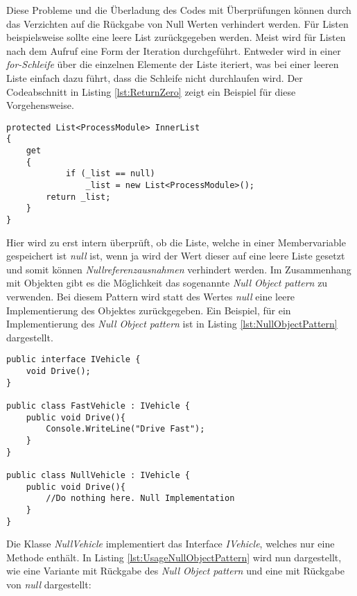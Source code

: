 \SuperPar Diese Probleme und die Überladung des Codes mit Überprüfungen können durch das Verzichten auf die Rückgabe von Null Werten verhindert werden. Für Listen beispielsweise sollte eine leere List zurückgegeben werden. Meist wird für Listen nach dem Aufruf eine Form der Iteration durchgeführt. Entweder wird in einer \textit{for-Schleife} über die einzelnen Elemente der Liste iteriert, was bei einer leeren Liste einfach dazu führt, dass die Schleife nicht durchlaufen wird. Der Codeabschnitt in Listing \ref{lst:ReturnZero} zeigt ein Beispiel für diese Vorgehensweise.

\begin{lstlisting}[language={[Sharp]C}, caption=Beispiele für Rückgabe einer leeren Liste statt eines Null Wertes, label=lst:ReturnZero]
protected List<ProcessModule> InnerList
{
	get
	{
			if (_list == null)
				_list = new List<ProcessModule>();
		return _list;
	}
}
\end{lstlisting}

\SuperPar Hier wird zu erst intern überprüft, ob die Liste, welche in einer Membervariable gespeichert ist \textit{null} ist, wenn ja wird der Wert dieser auf eine leere Liste gesetzt und somit können \textit{Nullreferenzausnahmen} verhindert werden. Im Zusammenhang mit Objekten gibt es die Möglichkeit das sogenannte \textit{Null Object pattern} \cite{Martin1997} zu verwenden. Bei diesem Pattern wird statt des Wertes \textit{null} eine leere Implementierung des Objektes zurückgegeben. Ein Beispiel, für ein Implementierung des \textit{Null Object pattern} ist in Listing \ref{lst:NullObjectPattern} dargestellt.

\begin{lstlisting}[language={[Sharp]C}, caption=Null Object pattern, label=lst:NullObjectPattern]
public interface IVehicle {
    void Drive();
}

public class FastVehicle : IVehicle {
    public void Drive(){
        Console.WriteLine("Drive Fast");
    }
}

public class NullVehicle : IVehicle {
    public void Drive(){
        //Do nothing here. Null Implementation
    }
}
\end{lstlisting}

\SuperPar Die Klasse \textit{NullVehicle} implementiert das Interface \textit{IVehicle}, welches nur eine Methode enthält. In Listing \ref{lst:UsageNullObjectPattern} wird nun dargestellt, wie eine Variante mit Rückgabe des \textit{Null Object pattern} und eine mit Rückgabe von \textit{null} dargestellt:

